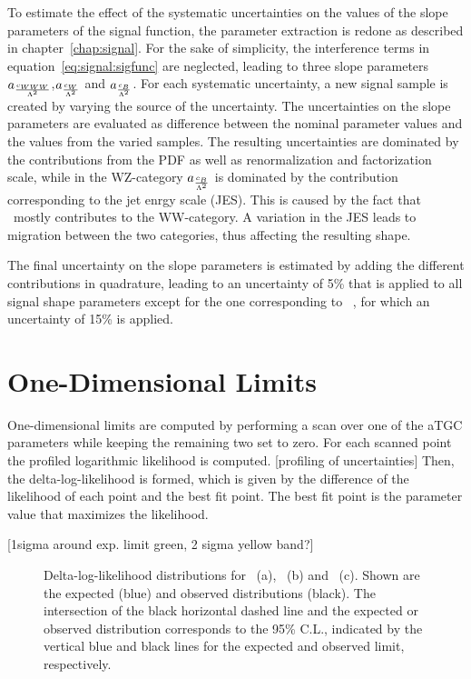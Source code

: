 \noindent To estimate the effect of the systematic uncertainties on the values of the slope parameters of the signal function, the parameter extraction is redone as described in chapter~\ref{chap:signal}. For the sake of simplicity, the interference terms in equation~\ref{eq:signal:sigfunc} are neglected, leading to three slope parameters $a_{\frac{c_{WWW}}{\Lambda^2}}$,$a_{\frac{c_{W}}{\Lambda^2}}$ and $a_{\frac{c_{B}}{\Lambda^2}}$. For each systematic uncertainty, a new signal sample is created by varying the source of the uncertainty. The uncertainties on the slope parameters are evaluated as difference between the nominal parameter values and the values from the varied samples. The resulting uncertainties are dominated by the contributions from the PDF as well as renormalization and factorization scale, while in the WZ-category $a_{\frac{c_{B}}{\Lambda^2}}$ is dominated by the contribution corresponding to the jet enrgy scale (JES). This is caused by the fact that \Tcb \ mostly contributes to the WW-category. A variation in the JES leads to migration between the two categories, thus affecting the resulting shape.

\noindent The final uncertainty on the slope parameters is estimated by adding the different contributions in quadrature, leading to an uncertainty of 5\% that is applied to all signal shape parameters except for the one corresponding to \Tcb \ , for which an uncertainty of 15\% is applied.

\section{One-Dimensional Limits}
One-dimensional limits are computed by performing a scan over one of the aTGC parameters while keeping the remaining two set to zero. For each scanned point the profiled logarithmic likelihood is computed.
[profiling of uncertainties]
Then, the delta-log-likelihood is formed, which is given by the difference of the likelihood of each point and the best fit point. The best fit point is the parameter value that maximizes the likelihood. 


[1sigma around exp. limit green, 2 sigma yellow band?]
\begin{figure}
	\centering
	\caption[Delta-log-likelihood distributions for the three aTGC parameters]{Delta-log-likelihood distributions for \Tcwww \ (a), \Tccw \ (b) and \Tcb \ (c). Shown are the expected (blue) and observed distributions (black). The intersection of the black horizontal dashed line and the expected or observed distribution corresponds to the 95\% C.L., indicated by the vertical blue and black lines for the expected and observed limit, respectively.}
	\label{fig:limits:1dlimits}
\end{figure}

